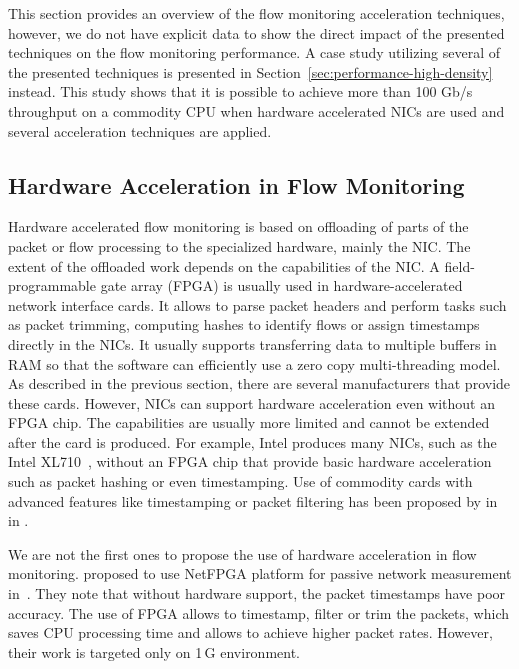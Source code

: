 This section provides an overview of the flow monitoring acceleration techniques, however, we do not have explicit data to show the direct impact of the presented techniques on the flow monitoring performance. A case study utilizing several of the presented techniques is presented in Section~\ref{sec:performance-high-density} instead. This study shows that it is possible to achieve more than 100 Gb/s throughput on a commodity CPU when hardware accelerated NICs are used and several acceleration techniques are applied.


\subsection{Hardware Acceleration in Flow Monitoring}\label{sec:performance-hw-acceleration}

Hardware accelerated flow monitoring is based on offloading of parts of the packet or flow processing to the specialized hardware, mainly the NIC. The extent of the offloaded work depends on the capabilities of the NIC. A field-programmable gate array (FPGA) is usually used in hardware-accelerated network interface cards. It allows to parse packet headers and perform tasks such as packet trimming, computing hashes to identify flows or assign timestamps directly in the NICs. It usually supports transferring data to multiple buffers in RAM so that the software can efficiently use a zero copy multi-threading model. As described in the previous section, there are several manufacturers that provide these cards. However, NICs can support hardware acceleration even without an FPGA chip. The capabilities are usually more limited and cannot be extended after the card is produced. For example, Intel produces many NICs, such as the Intel XL710~\cite{IntelCorporation-2014-xl710},  without an FPGA chip that provide basic hardware acceleration such as packet hashing or even timestamping. Use of commodity cards with advanced features like timestamping or packet filtering has been proposed by \citeauthor{Deri-2013-10} in~\cite{Deri-2013-10} in \citeyear{Deri-2013-10}.

We are not the first ones to propose the use of hardware acceleration in flow monitoring. \citeauthor{Antichi-2012-Enabling} proposed to use NetFPGA platform for passive network measurement in~\cite{Antichi-2012-Enabling}. They note that without hardware support, the packet timestamps have poor accuracy. The use of FPGA allows to timestamp, filter or trim the packets, which saves CPU processing time and allows to achieve higher packet rates. However, their work is targeted only on 1\,G environment.

